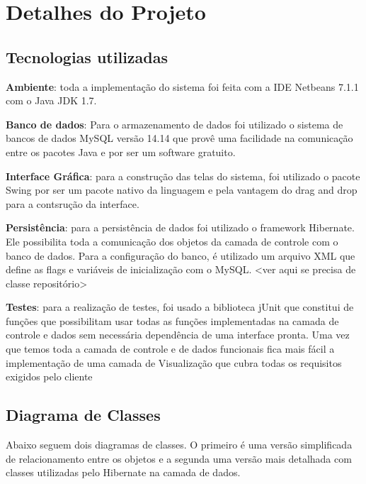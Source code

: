\documentclass[a4paper,10pt]{article}
\begin{document}

\section{Detalhes do Projeto}

\subsection{Tecnologias utilizadas}

\textbf{Ambiente}: toda a implementação do sistema foi feita com a IDE Netbeans 7.1.1 com o Java JDK 1.7.

\textbf{Banco de dados}: Para o armazenamento de dados foi utilizado o sistema de bancos de dados MySQL versão 14.14 que provê uma facilidade na comunicação entre os pacotes Java e por ser um software gratuito.

\textbf{Interface Gráfica}: para a construção das telas do sistema, foi utilizado o pacote Swing por ser um pacote nativo da linguagem e pela vantagem do drag and drop para a contsrução da interface.

\textbf{Persistência}: para a persistência de dados foi utilizado o framework Hibernate. Ele possibilita toda a comunicação dos objetos da camada de controle com o banco de dados. Para a configuração do banco, é utilizado um arquivo XML que define as flags e variáveis de inicialização com o MySQL. <ver aqui se precisa de classe repositório>

\textbf{Testes}: para a realização de testes, foi usado a biblioteca jUnit que constitui de funções que possibilitam usar todas as funções implementadas na camada de controle e dados sem necessária dependência de uma interface pronta. Uma vez que temos toda a camada de controle e de dados funcionais fica mais fácil a implementação de uma camada de Visualização que cubra todas os requisitos exigidos pelo cliente

\subsection{Diagrama de Classes}

Abaixo seguem dois diagramas de classes. O primeiro é uma versão simplificada de relacionamento entre os objetos e a segunda uma versão mais detalhada com classes utilizadas pelo Hibernate na camada de dados.
\end{document}
